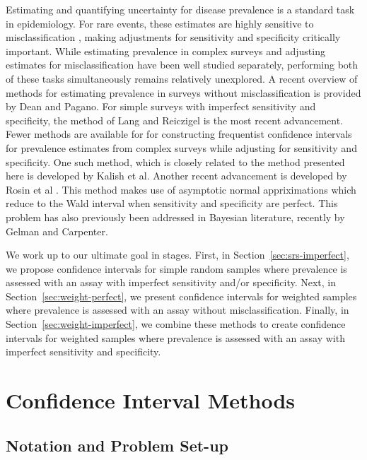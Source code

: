 \documentclass[AMA,STIX1COL]{WileyNJD-v2}
\begin{document}
Estimating and quantifying uncertainty for disease prevalence is a standard task in epidemiology.
For rare events, these estimates are highly sensitive to misclassification \cite{hemenwaySelfDefense}, making adjustments for sensitivity and specificity critically important.
While estimating prevalence in complex surveys and adjusting estimates for misclassification have been well studied separately, performing both of these tasks simultaneously remains relatively unexplored.
A recent overview of methods for estimating prevalence in surveys without misclassification is provided by Dean and Pagano\cite{Dean:2015}.
For simple surveys with imperfect sensitivity and specificity, the method of Lang and Reiczigel\cite{Lang:2014} is the most recent advancement\cite{Flor2020}.
Fewer methods are available for for constructing frequentist confidence intervals for prevalence estimates from complex surveys while adjusting for sensitivity and specificity.
One such method, which is closely related to the method presented here is developed by Kalish et al\cite{Kali:2021}.
Another recent advancement is developed by Rosin et al \cite{rosin2021estimating}.
This method makes use of asymptotic normal appriximations which reduce to the Wald interval when sensitivity and specificity are perfect.
This problem has also previously been addressed in Bayesian literature, recently by Gelman and Carpenter\cite{GelmanBayes}.

We work up to our ultimate goal in stages.
First, in Section~\ref{sec:srs-imperfect}, we propose confidence intervals for simple random samples where prevalence is assessed with an assay with imperfect sensitivity and/or specificity.
Next, in Section~\ref{sec:weight-perfect}, we present confidence intervals for weighted samples where prevalence is assessed with an assay without misclassification.
Finally, in Section~\ref{sec:weight-imperfect}, we combine these methods to create confidence intervals for weighted samples where prevalence is assessed with an assay with imperfect sensitivity and specificity.


\section{Confidence Interval Methods}

\subsection{Notation and Problem Set-up}
\end{document}
